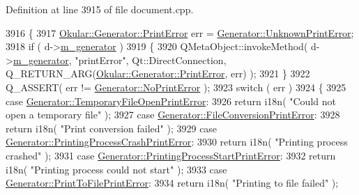 Definition at line 3915 of file document.\+cpp.


\begin{DoxyCode}
3916 \{
3917     \hyperlink{classOkular_1_1Generator_a43266d4eb3e7929924dd10ea53bc1d61}{Okular::Generator::PrintError} err = 
      \hyperlink{classOkular_1_1Generator_a43266d4eb3e7929924dd10ea53bc1d61a263e9cc38c84824414ea0b65e8deb408}{Generator::UnknownPrintError};
3918     \textcolor{keywordflow}{if} ( d->\hyperlink{classOkular_1_1DocumentPrivate_a52083f79ce95756ddea060e74315e91f}{m\_generator} )
3919     \{
3920         QMetaObject::invokeMethod( d->\hyperlink{classOkular_1_1DocumentPrivate_a52083f79ce95756ddea060e74315e91f}{m\_generator}, \textcolor{stringliteral}{"printError"}, Qt::DirectConnection, 
      Q\_RETURN\_ARG(\hyperlink{classOkular_1_1Generator_a43266d4eb3e7929924dd10ea53bc1d61}{Okular::Generator::PrintError}, err) );
3921     \}
3922     Q\_ASSERT( err != \hyperlink{classOkular_1_1Generator_a43266d4eb3e7929924dd10ea53bc1d61a6186f0488397997c9a950b5e5c1b472d}{Generator::NoPrintError} );
3923     \textcolor{keywordflow}{switch} ( err )
3924     \{
3925         \textcolor{keywordflow}{case} \hyperlink{classOkular_1_1Generator_a43266d4eb3e7929924dd10ea53bc1d61adbece3d0a13cec6d66bbc310be83da49}{Generator::TemporaryFileOpenPrintError}:
3926             \textcolor{keywordflow}{return} i18n( \textcolor{stringliteral}{"Could not open a temporary file"} );
3927         \textcolor{keywordflow}{case} \hyperlink{classOkular_1_1Generator_a43266d4eb3e7929924dd10ea53bc1d61aec9027f4e5cfdae52f83de14e52dde41}{Generator::FileConversionPrintError}:
3928             \textcolor{keywordflow}{return} i18n( \textcolor{stringliteral}{"Print conversion failed"} );
3929         \textcolor{keywordflow}{case} \hyperlink{classOkular_1_1Generator_a43266d4eb3e7929924dd10ea53bc1d61a4888a7455baba78b6f8cfe351956ba5e}{Generator::PrintingProcessCrashPrintError}:
3930             \textcolor{keywordflow}{return} i18n( \textcolor{stringliteral}{"Printing process crashed"} );
3931         \textcolor{keywordflow}{case} \hyperlink{classOkular_1_1Generator_a43266d4eb3e7929924dd10ea53bc1d61a2266cdd2bd6a63a77c566cd49e73839f}{Generator::PrintingProcessStartPrintError}:
3932             \textcolor{keywordflow}{return} i18n( \textcolor{stringliteral}{"Printing process could not start"} );
3933         \textcolor{keywordflow}{case} \hyperlink{classOkular_1_1Generator_a43266d4eb3e7929924dd10ea53bc1d61a0730ff074dea39b2f31be7d33812918a}{Generator::PrintToFilePrintError}:
3934             \textcolor{keywordflow}{return} i18n( \textcolor{stringliteral}{"Printing to file failed"} );

\end{DoxyCode}
